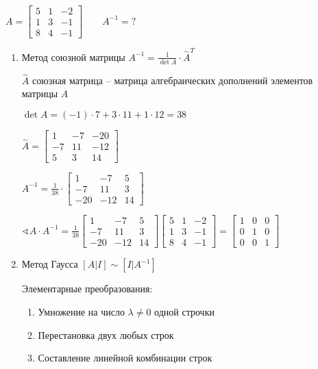 \documentclass{book}
\theoremstyle{definition}
\begin{document}
        \begin{problem}
            $A = \begin{bmatrix} 5 & 1 & -2\\ 1 & 3 & -1\\ 8 & 4 & -1 \end{bmatrix}\qquad A^{-1} = ? $
        \end{problem}
        \begin{enumerate}
            \item Метод союзной матрицы $A^{-1} = \frac{1}{\det A}\cdot \overset{\sim}A^T$ 
                \begin{definition}
                    $\overset{\sim }A$ союзная матрица -- матрица алгебраических дополнений элементов матрицы $A$
                \end{definition}

                $\det A = (-1)\cdot 7 + 3\cdot 11 + 1\cdot 12 = 38$

                $\overset{\sim }A = \begin{bmatrix} 1 & -7 & -20\\-7 & 11 & -12\\ 5 & 3 & 14 \end{bmatrix} $

                $A^{-1} = \frac{1}{38} \cdot \begin{bmatrix} 1 & -7 & 5 \\ -7 & 11 & 3\\ -20 & -12 & 14 \end{bmatrix} $ 

                $\sphericalangle A\cdot A^{-1} = \frac{1}{38}\begin{bmatrix} 1 & -7 & 5 \\ -7 & 11 & 3\\ -20 & -12 & 14 \end{bmatrix}\begin{bmatrix} 5 & 1 & -2\\ 1 & 3 & -1\\ 8 & 4 & -1 \end{bmatrix} = \begin{bmatrix} 1 & 0 & 0\\ 0 & 1 & 0\\ 0 & 0 & 1 \end{bmatrix} $
            \item Метод Гаусса 
                $[A|I]\sim [I|A^{-1}]$
                
                Элементарные преобразования:
                \begin{enumerate}
                    \item Умножение на число $\lambda\neq 0$ одной строчки
                    \item Перестановка двух любых строк
                    \item Составление линейной комбинации строк
                \end{enumerate}


\end{enumerate}
\end{document}
